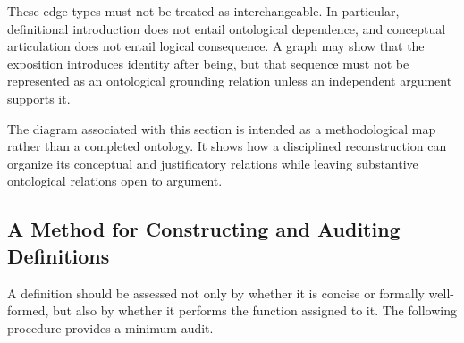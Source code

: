 These edge types must not be treated as interchangeable. In
particular, definitional introduction does not entail ontological
dependence, and conceptual articulation does not entail logical
consequence. A graph may show that the exposition introduces
identity after being, but that sequence must not be represented
as an ontological grounding relation unless an independent argument
supports it.

The diagram associated with this section is intended as a
methodological map rather than a completed ontology. It shows
how a disciplined reconstruction can organize its conceptual
and justificatory relations while leaving substantive ontological
relations open to argument.



\subsection{A Method for Constructing and Auditing Definitions}

A definition should be assessed not only by whether it is concise
or formally well-formed, but also by whether it performs the
function assigned to it. The following procedure provides a
minimum audit.

